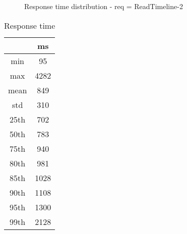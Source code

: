 \begin{minipage}{0.75\linewidth}
\begin{figure}[h]
\begin{adjustbox}{max width=1.0\linewidth, keepaspectratio}
  \end{adjustbox}
  \caption{Response time distribution - req = ReadTimeline-2}
\end{figure}
\end{minipage}\hfill\begin{minipage}{0.18\linewidth}
\begin{table}[h]
\begin{tabular}{|cc|}
\hline
\textbf{} & \textbf{ms}\\ \hline
 \Xhline{0.005\arrayrulewidth}
min & 95\\
 \Xhline{0.005\arrayrulewidth}
max & 4282\\
 \Xhline{0.005\arrayrulewidth}
mean & 849\\
 \Xhline{0.005\arrayrulewidth}
std & 310\\
\hline
\hline
 \Xhline{0.005\arrayrulewidth}
25th & 702\\
 \Xhline{0.005\arrayrulewidth}
50th & 783\\
 \Xhline{0.005\arrayrulewidth}
75th & 940\\
 \Xhline{0.005\arrayrulewidth}
80th & 981\\
 \Xhline{0.005\arrayrulewidth}
85th & 1028\\
 \Xhline{0.005\arrayrulewidth}
90th & 1108\\
 \Xhline{0.005\arrayrulewidth}
95th & 1300\\
 \Xhline{0.005\arrayrulewidth}
99th & 2128\\
\hline
\end{tabular}
\caption{Response time}
\end{table}
\end{minipage}\hfill